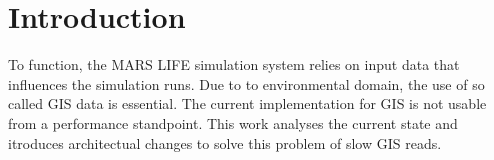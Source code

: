 
\chapter{Introduction}
To function, the MARS LIFE simulation system relies on input data that influences the simulation runs. Due to to environmental domain, the use of so called GIS data is essential. The current implementation for GIS is not usable from a performance standpoint. This work analyses the current state and itroduces architectual changes to solve this problem of slow GIS reads.
